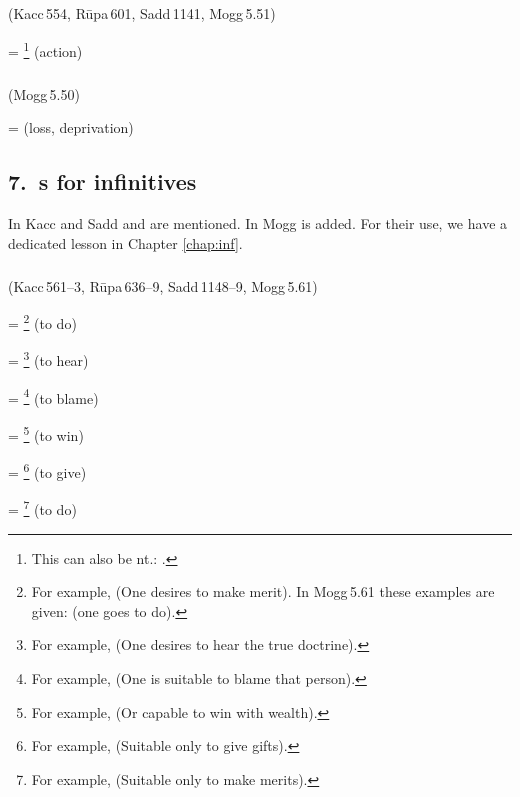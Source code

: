 \subparagraph*{} (Kacc\,554, R\=upa\,601, Sadd\,1141, Mogg\,5.51)\label{pacck6:ririya}

 = \footnote{ This can also be nt.: .} (action)\par

\subparagraph*{} (Mogg\,5.50)\label{pacck6:ni}

 =  (loss, deprivation)\par

\subsection*{7.\ s for infinitives}\label{kita:group7}\label{par:kitatum}

In Kacc and Sadd  and  are mentioned. In Mogg  is added. For their use, we have a dedicated lesson in Chapter \ref{chap:inf}. 

\subparagraph*{} (Kacc\,561--3, R\=upa\,636--9, Sadd\,1148--9, Mogg\,5.61)\label{pacck7:tave}\label{pacck7:tudm}\label{pacck7:taaye}

 = \footnote{For example,  (One desires to make merit). In Mogg\,5.61 these examples are given:  (one goes to do).} (to do)\par
{} = \footnote{For example,  (One desires to hear the true doctrine).} (to hear)\par
{} = \footnote{For example,  (One is suitable to blame that person).} (to blame)\par
{} = \footnote{For example,  (Or capable to win with wealth).} (to win)\par
{} = \footnote{For example,  (Suitable only to give gifts).} (to give)\par
{} = \footnote{For example,  (Suitable only to make merits).} (to do)\par

